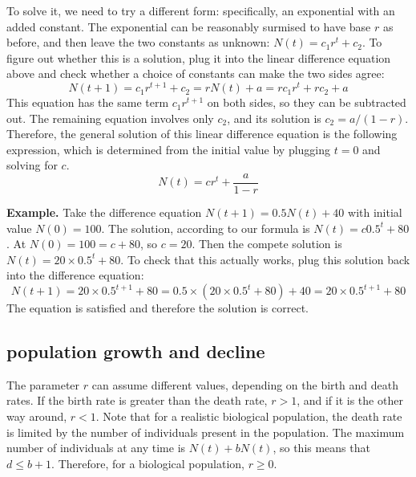 \documentclass[
]{book}
\theoremstyle{definition}
\theoremstyle{definition}
\theoremstyle{definition}
\theoremstyle{remark}
\begin{document}
To solve it, we need to try a different form: specifically, an exponential with an added constant. The exponential can be reasonably surmised to have base \(r\) as before, and then leave the two constants as unknown: \(N(t) = c_1 r^t + c_2\). To figure out whether this is a solution, plug it into the linear difference equation above and check whether a choice of constants can make the two sides agree:
\[  N(t+1) =  c_1 r^{t +1} + c_2 = rN(t) + a  = rc_1 r^t + rc_2+ a\]
This equation has the same term \(c_1 r^{t +1}\) on both sides, so they can be subtracted out. The remaining equation involves only \(c_2\), and its solution is \(c_2 = a/(1-r)\). Therefore, the general solution of this linear difference equation is the following expression, which is determined from the initial value by plugging \(t=0\) and solving for \(c\).
\begin{equation}
 N(t) = c r^t  + \frac{a}{1-r}
\label{eq:ch14_sol_wconst}
\end{equation}

\textbf{Example.} Take the difference equation \(N(t+1) = 0.5 N(t) + 40\) with initial value \(N(0)= 100\). The solution, according to our formula is \(N(t) = c 0.5^t + 80\). At \(N(0) = 100 = c+80\), so \(c=20\). Then the compete solution is \(N(t) = 20 \times 0.5^t + 80\). To check that this actually works, plug this solution back into the difference equation:
\[ N(t+1) = 20 \times 0.5^{t+1} + 80 = 0.5 \times (20 \times 0.5^t + 80) + 40 =  20 \times 0.5^{t+1} + 80\]
The equation is satisfied and therefore the solution is correct.

\hypertarget{population-growth-and-decline}{%
\subsection{population growth and decline}\label{population-growth-and-decline}}

\label{sec:bio14}

The parameter \(r\) can assume different values, depending on the birth and death rates. If the birth rate is greater than the death rate, \(r > 1\), and if it is the other way around, \(r < 1\). Note that for a realistic biological population, the death rate is limited by the number of individuals present in the population. The maximum number of individuals at any time is \(N(t)+bN(t)\), so this means that \(d \leq b +1\). Therefore, for a biological population, \(r \geq 0\).
\end{document}
